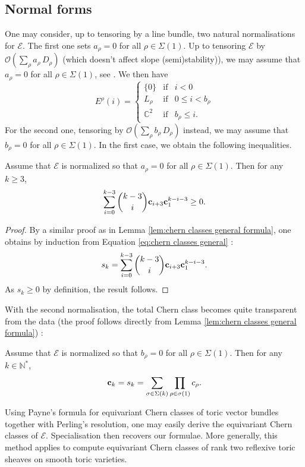 \documentclass[a4paper,10pt]{amsart}
\theoremstyle{plain}{
    \newtheorem{theorem}{Theorem}[section]
    \newtheorem{lemma}[theorem]{Lemma}
    \newtheorem{corollary}[theorem]{Corollary}
    \newtheorem{proposition}[theorem]{Proposition}
    \newtheorem{conjecture}[theorem]{Conjecture}
}
\theoremstyle{definition}{
    \newtheorem{definition}[theorem]{Definition}
    \newtheorem{defn-thm}[theorem]{Definition-Theorem}
    \newtheorem{example}[theorem]{Example}
    \newtheorem{notation}[theorem]{Notation}
}
\theoremstyle{remark}{
    \newtheorem{remark}[theorem]{Remark}
    \newtheorem{problem}[theorem]{Problem}
    \newtheorem{question}[theorem]{Question}
}
\def\uc{{\bf c}}
\def\cE{\mathcal{E}}
\def\cO{\mathcal{O}}
\def\N{\mathbb{N}}
\def\C{\mathbb{C}}
\begin{document}
\subsection{Normal forms}
\label{sec:normal forms}
One may consider, up to tensoring by a line bundle, two natural normalisations for $\cE$. The first one sets $a_\rho=0$ for all $\rho\in\Sigma(1)$. Up to tensoring $\cE$ by $\cO(\sum_{\rho}a_\rho\, D_\rho)$ (which doesn't affect slope (semi)stability)), we may assume that $a_\rho=0$ for all $\rho\in\Sigma(1)$, see \cite[Remark 2.2.15]{DDK20}. We then have 
$$
 E^\rho(i)=\left\{
 \begin{array}{ccc}
                  \lbrace 0 \rbrace & \mathrm{ if } & i< 0 \\
                  L_\rho & \mathrm{ if } & 0\leq i< b_\rho \\
\C^2 & \mathrm{ if } & b_\rho\leq i .
                  \end{array}
                  \right.
 $$
 For the second one, tensoring by $\cO(\sum_{\rho}b_\rho\, D_\rho)$ instead, we may assume that $b_\rho=0$ for all $\rho\in\Sigma(1)$. In the first case, we obtain the following inequalities.
 \begin{lemma}
  \label{lem:inequalities}
  Assume that $\cE$ is normalized so that $a_\rho=0$ for all $\rho\in\Sigma(1)$. Then for any $k\geq 3$,
  $$
  \sum_{i=0}^{k-3} \binom{k-3}{i}\uc_{i+3}\uc_1^{k-i-3}\geq 0.
  $$
 \end{lemma}
\begin{proof}
 By a similar proof as in Lemma \ref{lem:chern classes general formula}, one obtains by induction from Equation \eqref{eq:chern classes general} :
 $$
 s_k=\sum_{i=0}^{k-3} \binom{k-3}{i}\uc_{i+3}\uc_1^{k-i-3}.
 $$
 As $s_k\geq 0$ by definition, the result follows.
\end{proof}
With the second normalisation, the total Chern class becomes quite transparent from the data (the proof follows directly from Lemma \ref{lem:chern classes general formula}) :
\begin{corollary}
 \label{cor:chern classes normalized}
 Assume that $\cE$ is normalized so that $b_\rho=0$ for all $\rho\in\Sigma(1)$. Then for any $k\in \N^*$,
 $$
 \uc_k=s_k=\sum_{\sigma\in\Sigma(k)} \prod_{\rho\in\sigma(1)}c_\rho.
 $$
\end{corollary}
\begin{remark}
 \label{rem:relation to Payne's formula equiv Chern class}
 Using Payne's formula for equivariant Chern classes of toric vector bundles \cite[Proposition 3.1]{payne2008} together with Perling's resolution, one may easily derive the equivariant Chern classes of $\cE$. Specialisation then recovers our formulae. More generally, this method applies to compute equivariant Chern classes of rank two reflexive toric sheaves on smooth toric varieties.
\end{remark}
\end{document}
